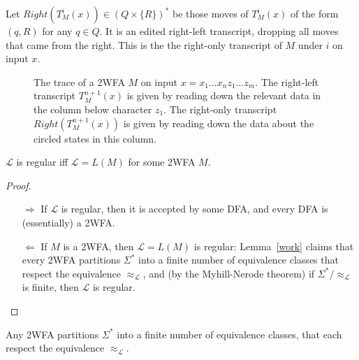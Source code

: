 \documentclass[11pt]{article}
\begin{document}
\begin{definition}
Let $Right(T_M^i(x)) \in (Q \times \{R\})^*$ be those moves of $T_M^i(x)$ of the form $(q,R)$ for any $q\in Q$. It is an edited right-left transcript, dropping all moves that came from the right. This is the the right-only transcript of $M$ under $i$ on input $x$.
\end{definition}

\begin{figure}[h]
\begin{center}\scalebox{.9}{}\end{center}
\caption{The trace of a 2WFA $M$ on input $x = x_1 \ldots x_n z_1 \ldots z_m$. The right-left transcript $T_M^{n+1}(x)$ is given by reading down the relevant data in the column below character $z_1$. The right-only transcript $Right(T_M^{n+1}(x))$ is given by reading down the data about the circled states in this column.}
\end{figure}

\pagebreak
\begin{lemma}
$\mathcal{L}$ is regular iff $\mathcal{L} = L(M)$ for some 2WFA $M$.
\end{lemma}

\begin{proof}\hfill
\begin{itemize}

\item[$\Longrightarrow$] If $\mathcal{L}$ is regular, then it is accepted by some DFA, and every DFA is (essentially) a 2WFA.

\item[$\Longleftarrow$] If $M$ is a 2WFA, then $\mathcal{L} = L(M)$ is regular: Lemma~\ref{work} claims that every 2WFA partitions $\Sigma^*$ into a finite number of equivalence classes that respect the equivalence $\approx_\mathcal{L}$, and (by the Myhill-Nerode theorem) if $\Sigma^* / \approx_\mathcal{L}$ is finite, then $\mathcal{L}$ is regular.
\end{itemize}\end{proof}

\begin{lemma}\label{work}
Any 2WFA partitions $\Sigma^*$ into a finite number of equivalence classes, that each respect the equivalence $\approx_\mathcal{L}$.
\end{lemma} 
\end{document}
